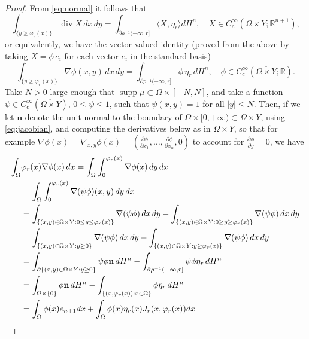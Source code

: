 \documentclass[10pt,a4paper]{amsart}
\newcommand{\R}{\mathbb{R}}
\begin{document}
\begin{proof}
 From \eqref{eq:normal} it follows that
 \[\int_{\{y\geq \varphi_r(x)\}}\operatorname{div}X\,dx\,dy=\int_{\partial \rho^{-1}(-\infty,r]} \langle X,\eta_r\rangle d H^n,\quad X\in C^\infty_c(\overline{\Omega\times Y};\R^{n+1}),\]
 or equivalently, we have the vector-valued identity (proved from the above by taking $X=\phi \,e_i$ for each vector $e_i$ in the standard basis)
 \begin{equation}\label{eq:previouslydisplayedidentity}
 \int_{\{y\geq \varphi_r(x)\}}\nabla \phi(x,y)\,dx\,dy=\int_{\partial \rho^{-1}(-\infty,r]} \phi\, \eta_r\, d H^n,\quad \phi\in C^\infty_c(\overline{\Omega\times Y};\R).
 \end{equation}
%
%
%
%
%
%
%
%
%
%
%
%
%
 Take $N>0$ large enough that $\operatorname{supp}\mu\subset\overline\Omega\times[-N,N]$, and take a function $\psi\in C^\infty_c(\overline{\Omega\times Y})$, $0\leq\psi\leq 1$, such that $\psi(x,y)=1$ for all $|y|\leq N$. 
  Then, if we let $\mathbf n$ denote the unit normal to the boundary of $\Omega\times [0,+\infty)\subset\Omega\times Y$,  using \eqref{eq:jacobian}, and computing the derivatives below as in $\Omega\times Y$, so that for example $\nabla \phi(x)=\nabla_{x,y} \phi(x)=(\frac{\partial\phi}{\partial x_1},\dots,\frac{\partial\phi}{\partial x_n},0)$ to account for $\frac{\partial\phi}{\partial y}=0$, we have
 \begin{align*}
     \int_\Omega&\varphi_r(x)\nabla\phi(x)\,dx= \int_\Omega\int_0^{\varphi_r(x)}\nabla \phi(x)\,dy\,dx\\
     &=\int_\Omega\int_0^{\varphi_r(x)}\nabla (\psi\phi)(x,y)\,dy\,dx\\
     \notag &=\int_{\{(x,y)\in\Omega\times Y:0\leq y\leq \varphi_r(x)\}}\nabla(\psi\phi)\,dx\,dy
     -\int_{\{(x,y)\in\Omega\times Y:0\geq y\geq \varphi_r(x)\}}\nabla(\psi\phi)\,dx\,dy \\
     \notag &=\int_{\{(x,y)\in\Omega\times Y:y\geq 0\}}\nabla(\psi\phi)\,dx\,dy-\int_{\{(x,y)\in\Omega\times Y:y\geq \varphi_r(x)\}}\nabla(\psi\phi)\,dx\,dy \\
     \notag &=\int_{\partial\{(x,y)\in\Omega\times Y:y\geq 0\}} \psi\phi\mathbf{n}\,dH^n-\int_{\partial\rho^{-1}(-\infty,r]} \psi\phi\eta_r\,dH^n\\
     \notag &=\int_{\Omega\times \{0\}} \phi\mathbf{n}\,dH^n-\int_{\{(x,\varphi_r(x)):x\in\Omega\}} \phi\eta_r\,dH^n\\
     &=\int_\Omega \phi(x)e_{n+1}dx+\int_\Omega\phi(x)\eta_r(x)J_r(x,\varphi_r(x))%
     dx
 \end{align*}

\end{proof}
\end{document}

